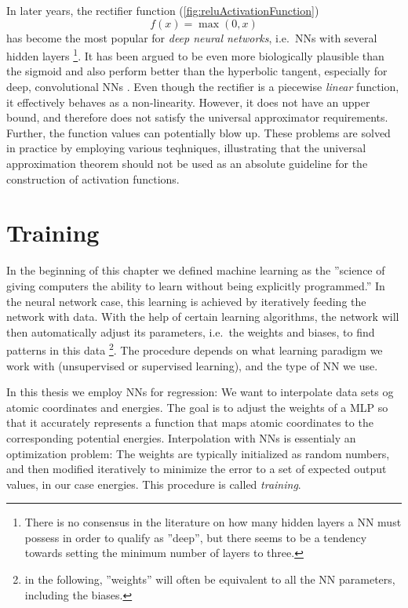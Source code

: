 \documentclass[twoside,english]{uiofysmaster}
\begin{document}
\noindent In later years, the rectifier function (\autoref{fig:reluActivationFunction})
\begin{equation}
 f(x) = \max(0,x)
 \label{reluActivationFunction}
\end{equation}
has become the most popular \cite{LeCun15} for \textit{deep neural networks}, i.e.\ NNs with several hidden layers%
\footnote{There is no consensus in the literature on how many hidden layers a NN must possess in order to qualify as ''deep'', 
but there seems to be a tendency towards setting the minimum number of layers to three.}.
It has been argued to be even more biologically plausible than the sigmoid and also perform better
than the hyperbolic tangent, especially for deep, convolutional NNs \cite{Glorot11}. Even though the rectifier is a
piecewise \textit{linear} function, it effectively behaves as a non-linearity. However, it does not have an upper bound, and
therefore does not satisfy the universal approximator requirements. Further, the function values can potentially blow up. 
These problems are solved in practice by employing various teqhniques, illustrating that the universal approximation theorem
should not be used as an absolute guideline for the construction of activation functions. 


\section{Training} \label{sec:training}
In the beginning of this chapter we defined machine learning as the ''science of giving computers the ability to learn without
being explicitly programmed.'' In the neural network case, this learning is achieved by iteratively feeding the network with data. 
With the help of certain learning algorithms, the network will then automatically adjust its parameters, i.e.\ the weights and biases, 
to find patterns in this data%
\footnote{in the following, ''weights'' will often be equivalent to all the NN parameters, including the biases.}.
The procedure depends on what learning paradigm we work with
(unsupervised or supervised learning), and the type of NN we use. 

In this thesis we employ NNs for regression: We want to interpolate data sets og atomic coordinates and energies.
The goal is to adjust the weights of a MLP so that it accurately represents a function that maps
atomic coordinates to the corresponding potential energies. Interpolation with NNs is essentialy an optimization problem:
The weights are typically initialized as random numbers, and then modified iteratively to minimize the error
to a set of expected output values, in our case energies. 
This procedure is called \textit{training}. 
\end{document}

